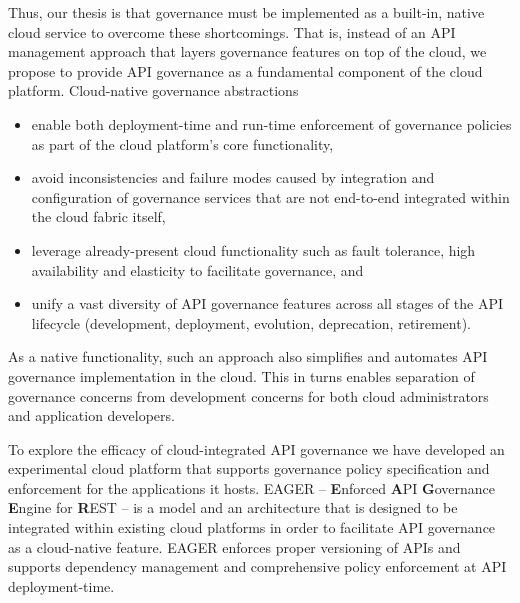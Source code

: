 Thus, our thesis is that governance must be implemented as a built-in, native
cloud service to overcome these shortcomings.
That is, instead of an API management
approach that layers governance features on top of the cloud, 
we propose to provide API governance as a fundamental component of the cloud
platform.  Cloud-native governance abstractions
\begin{itemize}
\item enable both deployment-time and run-time enforcement of governance
policies as part of the cloud platform's core functionality,
\item avoid inconsistencies and failure modes caused  
by integration and configuration of governance services that are not
end-to-end integrated within the cloud fabric itself, 
\item leverage already-present cloud functionality such as fault tolerance,
high availability and elasticity to facilitate governance, and
\item unify a vast diversity of API
governance features across all stages of the API lifecycle
(development, deployment, evolution, deprecation, retirement). 
\end{itemize}
As a native functionality, such an
approach also simplifies and automates API governance implementation in the cloud.
This in turns enables separation of governance concerns from development concerns
for both cloud administrators and application developers.

To explore the efficacy of cloud-integrated API governance we have developed
an experimental cloud platform that supports governance policy specification
and enforcement for the applications it hosts. 
EAGER -- {\bf E}nforced {\bf A}PI {\bf G}overnance
{\bf E}ngine for {\bf R}EST -- is a model and an architecture that is designed
to be integrated within existing
cloud platforms in order to facilitate API governance as a 
cloud-native feature. EAGER enforces proper versioning of APIs and supports dependency 
management and comprehensive policy enforcement at API deployment-time. 

